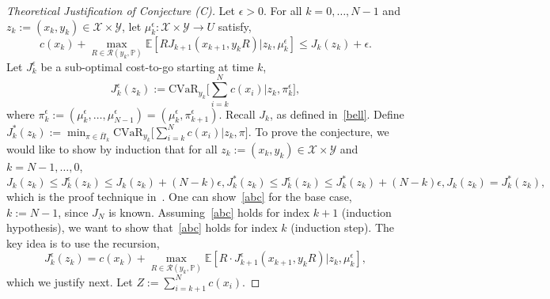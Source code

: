 \documentclass[letterpaper, 10 pt, conference]{ieeeconf}  %
\begin{document}
\begin{proof}[Theoretical Justification of Conjecture (C)]
Let $\epsilon > 0$. For all $k = 0, \dots, N-1$ and $z_k := (x_k, y_k) \in \mathcal{X} \times \mathcal{Y}$, let $\mu_k^\epsilon : \mathcal{X} \times \mathcal{Y} \to U$ satisfy,
%
\begin{equation} 
c(x_k) + {\underset{R \in \mathcal{R}(y_k, \mathbb{P})}\max} \mathbb{E}[ RJ_{k+1}(x_{k+1}, y_k R) | z_k, \mu_k^\epsilon] \leq J_k(z_k) + \epsilon.
\label{first}\end{equation} 
%
Let $J_k^\epsilon$ be a sub-optimal cost-to-go starting at time $k$,
%
\begin{equation} 
J_k^\epsilon(z_k) := \text{CVaR}_{y_k}\big[\textstyle \sum_{i=k}^N c(x_i) \big| z_k, \pi_k^\epsilon \big],
\label{Jkeps}\end{equation}
%
where $\pi_k^\epsilon := (\mu_k^\epsilon,\dots,\mu_{N-1}^\epsilon) = (\mu_k^\epsilon, \pi_{k+1}^\epsilon)$. Recall $J_k$, as defined in~\eqref{bell}. Define $J_k^*(z_k) := \min_{\pi \in \bar{\Pi}_k} \text{CVaR}_{y_k}\big[\textstyle \sum_{i=k}^N c(x_i) \big| z_k, \pi \big]$.
To prove the conjecture, we would like to show  by induction that for all $z_k := (x_k, y_k) \in \mathcal{X} \times \mathcal{Y}$ and $k = N-1, \dots, 0$,
%
\begin{subequations}\label{abc}
\begin{equation}
J_k(z_k) \leq J_k^\epsilon(z_k) \leq J_k(z_k) + (N-k)\epsilon, 
\label{a}\end{equation}
%
\begin{equation}
J_k^*(z_k) \leq J_k^\epsilon(z_k) \leq J_k^*(z_k) + (N-k)\epsilon, 
\label{b}\end{equation}
%
\begin{equation}
J_k(z_k) = J_k^*(z_k), 
\label{c}\end{equation}
\end{subequations}
%
which is the proof technique in~\cite[Sec. 1.5]{bertsekas2005dynamic}. 
One can show~\eqref{abc} for the base case, $k := N-1$, since $J_N$ is known.
Assuming~\eqref{abc} holds for index $k+1$ (induction hypothesis), we want to show that~\eqref{abc} holds for index $k$ (induction step). The key 
idea is to use the recursion,
%
\begin{equation}
J_k^\epsilon(z_k) = c(x_k) + {\underset{R \in \mathcal{R}(y_k, \mathbb{P})}\max} \mathbb{E}[ R\cdot J^\epsilon_{k+1}(x_{k+1}, y_k R) | z_k, \mu_k^\epsilon],
\label{Jkepsrec}\end{equation}
%
which we justify next. Let $Z := \sum_{i=k+1}^N c(x_i)$. 

\end{proof}
\end{document}
